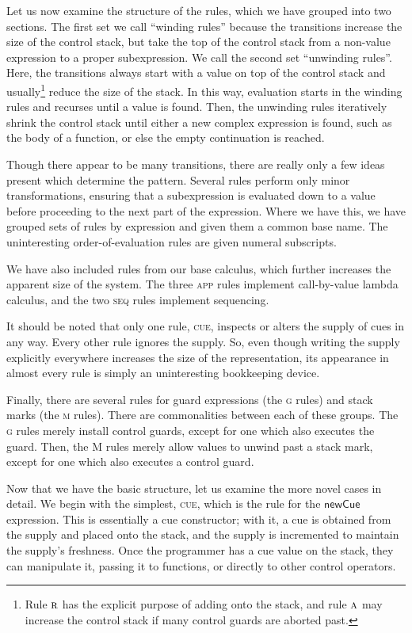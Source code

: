 \documentclass[11pt]{article}
\begin{document}
Let us now examine the structure of the rules, which we have grouped into two sections.
The first set we call ``winding rules'' because the transitions increase the size of the control stack, but take the top of the control stack from a non-value expression to a proper subexpression.
We call the second set ``unwinding rules''.
Here, the transitions always start with a value on top of the control stack and usually\footnote{Rule $\textsc{r}$ has the explicit purpose of adding onto the stack, and rule $\textsc{a}$ may increase the control stack if many control guards are aborted past.} reduce the size of the stack.
In this way, evaluation starts in the winding rules and recurses until a value is found.
Then, the unwinding rules iteratively shrink the control stack until either a new complex expression is found, such as the body of a function, or else the empty continuation is reached.

Though there appear to be many transitions, there are really only a few ideas present which determine the pattern.
Several rules perform only minor transformations, ensuring that a subexpression is evaluated down to a value before proceeding to the next part of the expression.
Where we have this, we have grouped sets of rules by expression and given them a common base name.
The uninteresting order-of-evaluation rules are given numeral subscripts.

We have also included rules from our base calculus, which further increases the apparent size of the system.
The three \textsc{app} rules implement call-by-value lambda calculus, and the two \textsc{seq} rules implement sequencing.

It should be noted that only one rule, \textsc{cue}, inspects or alters the supply of cues in any way.
Every other rule ignores the supply.
So, even though writing the supply explicitly everywhere increases the size of the representation, its appearance in almost every rule is simply an uninteresting bookkeeping device.

Finally, there are several rules for guard expressions (the \textsc{g} rules) and stack marks (the \textsc{m} rules).
There are commonalities between each of these groups.
The \textsc{g} rules merely install control guards, except for one which also executes the guard.
Then, the \textsc{M} rules merely allow values to unwind past a stack mark, except for one which also executes a control guard.

Now that we have the basic structure, let us examine the more novel cases in detail.
We begin with the simplest, \textsc{cue}, which is the rule for the $\textsf{newCue}$ expression.
This is essentially a cue constructor;
with it, a cue is obtained from the supply and placed onto the stack, and the supply is incremented to maintain the supply's freshness.
Once the programmer has a cue value on the stack, they can manipulate it, passing it to functions, or directly to other control operators.
\end{document}
